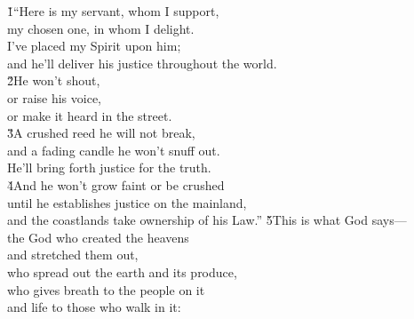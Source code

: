 \begin{poetry}
\poeml {}
\v{1}``Here is my servant, whom I support, \\
\poemll    my chosen one, in whom I delight. \\
\poeml I've placed my Spirit upon him; \\
\poemll    and he'll deliver his justice throughout the world. \\
\poeml \v{2}He won't shout, \\
\poemll    or raise his voice, \\
\poemlll       or make it heard in the street. \\
\poeml \v{3}A crushed reed he will not break, \\
\poemll    and a fading candle he won't snuff out. \\
\poemlll       He'll bring forth justice for the truth. \\
\poeml \v{4}And he won't grow faint or be crushed \\
\poemll    until he establishes justice on the mainland, \\
\poemlll       and the coastlands take ownership of his Law.''
\poeml \v{5}This is what God says--- \\
\poemll    the God who created the heavens \\
\poemlll       and stretched them out, \\
\poeml who spread out the earth and its produce, \\
\poemll    who gives breath to the people on it \\
\poemlll       and life to those who walk in it: \\

\end{poetry}
